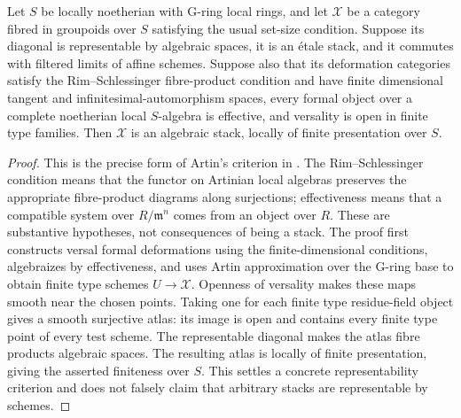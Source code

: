 \begin{theorem}\label{thm:B3-stacks}
Let $S$ be locally noetherian with G-ring local rings, and let
$\mathcal X$ be a category fibred in groupoids over $S$ satisfying the
usual set-size condition. Suppose its diagonal is representable by
algebraic spaces, it is an \'etale stack, and it commutes with filtered
limits of affine schemes. Suppose also that its deformation categories
satisfy the Rim--Schlessinger fibre-product condition and have finite
dimensional tangent and infinitesimal-automorphism spaces, every
formal object over a complete noetherian local $S$-algebra is effective,
and versality is open in finite type families. Then $\mathcal X$ is
an algebraic stack, locally of finite presentation over $S$.
\end{theorem}
\begin{proof}
This is the precise form of Artin's criterion in
\cite[Lemma 98.17.1, tag 07Y4, with axioms in Section 98.14,
tag 07XJ]{BStacks}. The Rim--Schlessinger condition means that the
functor on Artinian local algebras preserves the appropriate
fibre-product diagrams along surjections; effectiveness means that a
compatible system over $R/\mathfrak m^n$ comes from an object over $R$.
These are substantive hypotheses, not consequences of being a stack.
The proof first constructs versal formal deformations using the
finite-dimensional conditions, algebraizes by effectiveness, and
uses Artin approximation over the G-ring base to obtain finite type
schemes $U\to\mathcal X$. Openness of versality makes these maps
smooth near the chosen points. Taking one for each finite type
residue-field object gives a smooth surjective atlas: its image is
open and contains every finite type point of every test scheme.
The representable diagonal makes the atlas fibre products algebraic
spaces. The resulting atlas is locally of finite presentation, giving
the asserted finiteness over $S$. This settles a concrete
representability criterion and does not falsely claim that arbitrary
stacks are representable by schemes.
\end{proof}

